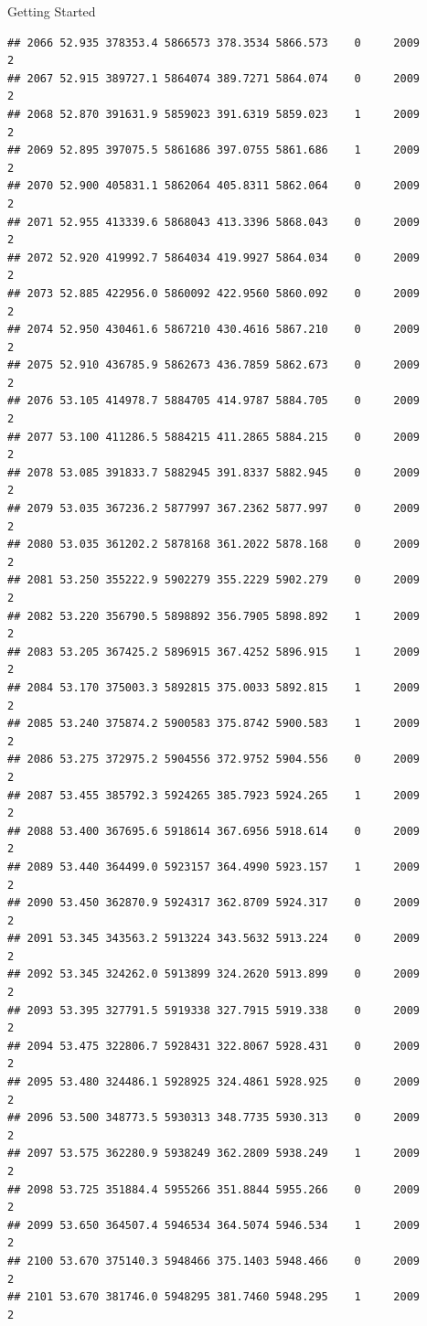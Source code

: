 \documentclass[
  ignorenonframetext,
]{beamer}
\begin{document}
\begin{frame}[fragile]{Getting Started}
\begin{verbatim}
## 2066 52.935 378353.4 5866573 378.3534 5866.573    0     2009        2
## 2067 52.915 389727.1 5864074 389.7271 5864.074    0     2009        2
## 2068 52.870 391631.9 5859023 391.6319 5859.023    1     2009        2
## 2069 52.895 397075.5 5861686 397.0755 5861.686    1     2009        2
## 2070 52.900 405831.1 5862064 405.8311 5862.064    0     2009        2
## 2071 52.955 413339.6 5868043 413.3396 5868.043    0     2009        2
## 2072 52.920 419992.7 5864034 419.9927 5864.034    0     2009        2
## 2073 52.885 422956.0 5860092 422.9560 5860.092    0     2009        2
## 2074 52.950 430461.6 5867210 430.4616 5867.210    0     2009        2
## 2075 52.910 436785.9 5862673 436.7859 5862.673    0     2009        2
## 2076 53.105 414978.7 5884705 414.9787 5884.705    0     2009        2
## 2077 53.100 411286.5 5884215 411.2865 5884.215    0     2009        2
## 2078 53.085 391833.7 5882945 391.8337 5882.945    0     2009        2
## 2079 53.035 367236.2 5877997 367.2362 5877.997    0     2009        2
## 2080 53.035 361202.2 5878168 361.2022 5878.168    0     2009        2
## 2081 53.250 355222.9 5902279 355.2229 5902.279    0     2009        2
## 2082 53.220 356790.5 5898892 356.7905 5898.892    1     2009        2
## 2083 53.205 367425.2 5896915 367.4252 5896.915    1     2009        2
## 2084 53.170 375003.3 5892815 375.0033 5892.815    1     2009        2
## 2085 53.240 375874.2 5900583 375.8742 5900.583    1     2009        2
## 2086 53.275 372975.2 5904556 372.9752 5904.556    0     2009        2
## 2087 53.455 385792.3 5924265 385.7923 5924.265    1     2009        2
## 2088 53.400 367695.6 5918614 367.6956 5918.614    0     2009        2
## 2089 53.440 364499.0 5923157 364.4990 5923.157    1     2009        2
## 2090 53.450 362870.9 5924317 362.8709 5924.317    0     2009        2
## 2091 53.345 343563.2 5913224 343.5632 5913.224    0     2009        2
## 2092 53.345 324262.0 5913899 324.2620 5913.899    0     2009        2
## 2093 53.395 327791.5 5919338 327.7915 5919.338    0     2009        2
## 2094 53.475 322806.7 5928431 322.8067 5928.431    0     2009        2
## 2095 53.480 324486.1 5928925 324.4861 5928.925    0     2009        2
## 2096 53.500 348773.5 5930313 348.7735 5930.313    0     2009        2
## 2097 53.575 362280.9 5938249 362.2809 5938.249    1     2009        2
## 2098 53.725 351884.4 5955266 351.8844 5955.266    0     2009        2
## 2099 53.650 364507.4 5946534 364.5074 5946.534    1     2009        2
## 2100 53.670 375140.3 5948466 375.1403 5948.466    0     2009        2
## 2101 53.670 381746.0 5948295 381.7460 5948.295    1     2009        2

\end{verbatim}
\end{frame}
\end{document}
